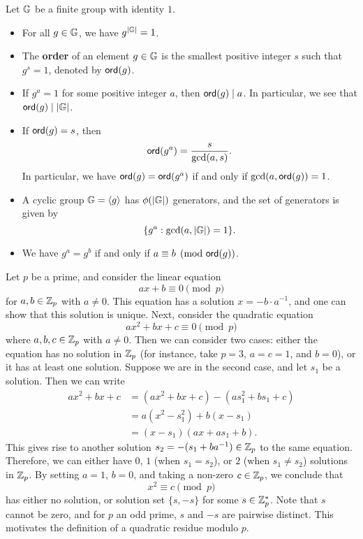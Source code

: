 \begin{prop}
Let $\mathbb{G}$ be a finite group with identity $1$. 
\begin{itemize}
    \item For all $g \in \mathbb{G}$, we have $g^{|\mathbb{G}|} = 1$. 
    \item The {\bf order} of an element $g \in \mathbb{G}$ is the smallest positive integer $s$ such that 
    $g^s = 1$, denoted by ${\sf ord}(g)$. 
    \item If $g^a = 1$ for some positive integer $a$, then ${\sf ord}(g) \mid a$. In particular, we see that 
    ${\sf ord}(g) \mid |\mathbb{G}|$. 
    \item If ${\sf ord}(g) = s$, then 
    \[ {\sf ord}(g^a) = \frac{s}{\gcd(a, s)}. \]
    In particular, we have ${\sf ord}(g) = {\sf ord}(g^a)$ if and only if $\gcd(a, {\sf ord}(g)) = 1$. 
    \item A cyclic group $\mathbb{G} = \langle g \rangle$ has $\phi(|\mathbb{G}|)$ generators, and the set of 
    generators is given by 
    \[ \{g^a : \gcd(a, |\mathbb{G}|) = 1\}. \]
    \item We have $g^a = g^b$ if and only if $a \equiv b \pmod{{\sf ord}(g)}$. 
\end{itemize}
\end{prop}

Let $p$ be a prime, and consider the linear equation 
\[ ax + b \equiv 0 \pmod p \]
for $a, b \in \mathbb{Z}_p$ with $a \neq 0$. This equation has a solution $x = -b \cdot a^{-1}$, and one can 
show that this solution is unique. Next, consider the quadratic equation 
\[ ax^2 + bx + c \equiv 0 \pmod p \]
where $a, b, c \in \mathbb{Z}_p$ with $a \neq 0$. Then we can consider two cases: either the equation 
has no solution in $\mathbb{Z}_p$ (for instance, take $p = 3$, $a = c = 1$, and $b = 0$), or 
it has at least one solution. Suppose we are in the second case, and let $s_1$ be a solution. Then 
we can write 
\begin{align*}
    ax^2 + bx + c &= (ax^2 + bx + c) - (as_1^2 + bs_1 + c) \\
    &= a(x^2 - s_1^2) + b(x - s_1) \\
    &= (x - s_1)(ax + as_1 + b). 
\end{align*}
This gives rise to another solution $s_2 = -(s_1 + ba^{-1}) \in \mathbb{Z}_p$ to the same equation. 
Therefore, we can either have $0$, $1$ (when $s_1 = s_2$), or $2$ (when $s_1 \neq s_2$) solutions in 
$\mathbb{Z}_p$. By setting $a = 1$, $b = 0$, and taking a non-zero $c \in \mathbb{Z}_p$, we conclude that 
\[ x^2 \equiv c \pmod p \]
has either no solution, or solution set $\{s, -s\}$ for some $s \in \mathbb{Z}_p^*$. Note that $s$ cannot 
be zero, and for $p$ an odd prime, $s$ and $-s$ are pairwise distinct. This motivates the 
definition of a quadratic residue modulo $p$. 

